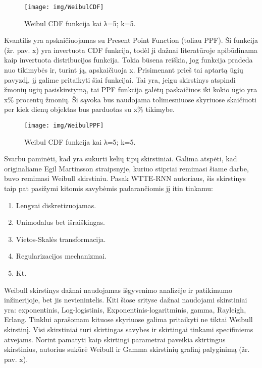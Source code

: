 \documentclass{VUMIFPSkursinis}
\begin{document}
\begin{figure}[H]
  \centering
  \texttt{[image: img/WeibulCDF]}
  \caption{ Weibul CDF funkcija kai λ=5; k=5.}
  \label{img:WeibulCDF}
\end{figure}

Kvantilis yra apskaičiuojamas su Present Point Function (toliau PPF). Ši funkcija (žr. pav. x) yra invertuota CDF funkcija, todėl ji dažnai literatūroje apibūdinama kaip invertuota distribucijos funkcija. Tokia būsena reiškia, jog funkcija pradeda nuo tikimybės ir, turint ją, apskaičiuoja x. Prisimenant prieš tai aptartą ūgių pavyzdį, jį galime pritaikyti šiai funkcijai. Tai yra, jeigu skirstinys atspindi žmonių ūgių pasiskirstymą, tai PPF funkcija galėtų paskaičiuos iki kokio ūgio yra x\% procentų žmonių. Ši sąvoka bus naudojama tolimesniuose skyriuose skaičiuoti per kiek dienų objektas bus parduotas su x\% tikimybe.


\begin{figure}[H]
  \centering
  \texttt{[image: img/WeibulPPF]}
  \caption{  Weibul CDF funkcija kai λ=5; k=5.}
  \label{img:WeibulPPF}
\end{figure}

Svarbu paminėti, kad yra sukurti kelių tipų skirstiniai. Galima atspėti, kad originaliame Egil Martinsson straipsnyje, kuriuo stipriai remimasi šiame darbe, buvo remimasi Weibull skirstiniu. Pasak WTTE-RNN autoriaus, šis skirstinys taip pat pasižymi kitomis savybėmis padarančiomis jį itin tinkamu:

\begin{enumerate}
  \item Lengvai diskretizuojamas.
  \item Unimodalus bet išraiškingas.
  \item Vietos-Skalės transformacija.
  \item Regularizacijos mechanizmai.
  \item Kt.
\end{enumerate}

Weibull skirstinys dažnai naudojamas išgyvenimo analizėje ir patikimumo inžinerijoje, bet jis nevienintelis. Kiti šiose srityse dažnai naudojami skirstiniai yra: exponentinis, Log-logistinis, Exponentinis-logaritminis, gamma, Rayleigh, Erlang. Tinklui aprašomam kituose skyriuose galima pritaikyti ne tiktai Weibull skirstinį. Visi skirstiniai turi skirtingas savybes ir skirtingai tinkami specifiniems atvejams. Norint pamatyti kaip skirtingi parametrai paveikia skirtingus skirstinius, autorius sukūrė Weibull ir Gamma skirstinių grafinį palyginimą (žr. pav. x).
\end{document}
